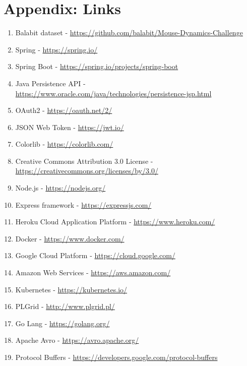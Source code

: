 \thispagestyle{plain}
\section*{Appendix: Links}\label{sec:links}
\begin{enumerate}
    \item Balabit dataset - \url{https://github.com/balabit/Mouse-Dynamics-Challenge}\label{itm:balabit}
    \item Spring - \url{https://spring.io/}\label{itm:spring}
    \item Spring Boot - \url{https://spring.io/projects/spring-boot}\label{itm:spring-boot}
    \item Java Persistence API - \url{https://www.oracle.com/java/technologies/persistence-jsp.html}\label{itm:jpa}
    \item OAuth2 - \url{https://oauth.net/2/}\label{itm:oauth2}
    \item JSON Web Token - \url{https://jwt.io/}\label{itm:jwt}
    \item Colorlib - \url{https://colorlib.com/}\label{itm:colorlib}
    \item Creative Commons Attribution 3.0 License - \url{https://creativecommons.org/licenses/by/3.0/}\label{itm:license}
    \item Node.js - \url{https://nodejs.org/}\label{itm:node}
    \item Express framework - \url{https://expressjs.com/}\label{itm:express}
    \item Heroku Cloud Application Platform - \url{https://www.heroku.com/}\label{itm:heroku}
    \item Docker - \url{https://www.docker.com/}\label{itm:docker}
    \item Google Cloud Platform - \url{https://cloud.google.com/}\label{itm:gcp}
    \item Amazon Web Services - \url{https://aws.amazon.com/}\label{itm:aws}
    \item Kubernetes - \url{https://kubernetes.io/}\label{itm:kubernetes}
    \item PLGrid - \url{http://www.plgrid.pl/}\label{itm:plgrid}
    \item Go Lang - \url{https://golang.org/}\label{itm:golang}
    \item Apache Avro - \url{https://avro.apache.org/}\label{itm:avro}
    \item Protocol Buffers - \url{https://developers.google.com/protocol-buffers}\label{itm:protobuf}

\end{enumerate}
